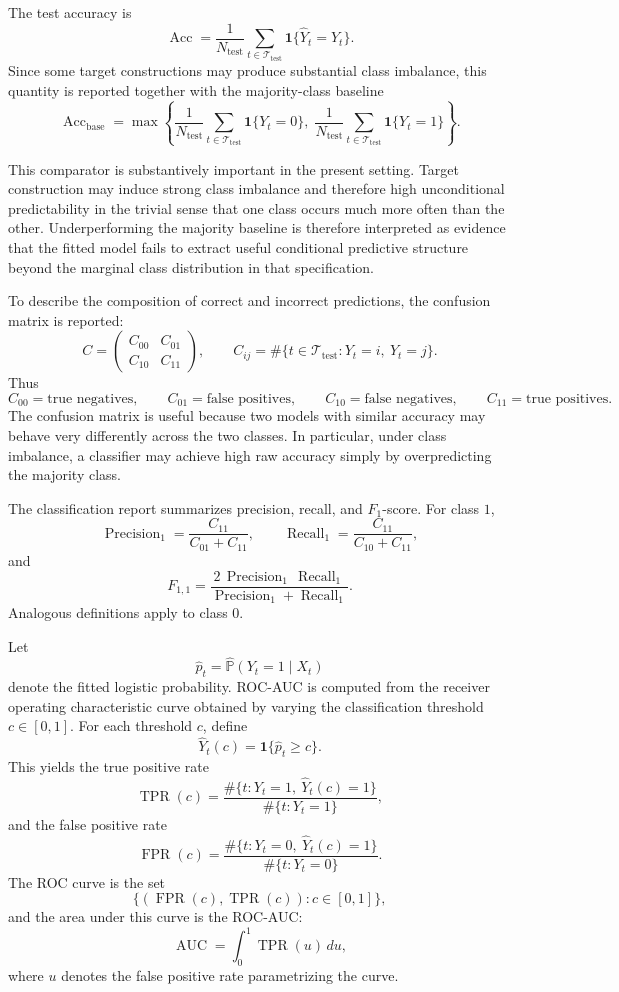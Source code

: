 \documentclass[11pt,a4paper]{article}
\begin{document}
	The test accuracy is
	\[
	\operatorname{Acc}
	=
	\frac{1}{N_{\mathrm{test}}}
	\sum_{t \in \mathcal{T}_{\mathrm{test}}}
	\mathbf{1}\{\widehat Y_t = Y_t\}.
	\]
	Since some target constructions may produce substantial class imbalance, this quantity is reported together with the majority-class baseline
	\[
	\operatorname{Acc}_{\mathrm{base}}
	=
	\max\!\left\{
	\frac{1}{N_{\mathrm{test}}}\sum_{t\in\mathcal{T}_{\mathrm{test}}}\mathbf{1}\{Y_t=0\},
	\;
	\frac{1}{N_{\mathrm{test}}}\sum_{t\in\mathcal{T}_{\mathrm{test}}}\mathbf{1}\{Y_t=1\}
	\right\}.
	\]

	This comparator is substantively important in the present setting. Target construction may induce strong class imbalance and therefore high unconditional predictability in the trivial sense that one class occurs much more often than the other. Underperforming the majority baseline is therefore interpreted as evidence that the fitted model fails to extract useful conditional predictive structure beyond the marginal class distribution in that specification.

	To describe the composition of correct and incorrect predictions, the confusion matrix is reported:
	\[
	C
	=
	\begin{pmatrix}
	C_{00} & C_{01}\\
	C_{10} & C_{11}
	\end{pmatrix},
	\qquad
	C_{ij}
	=
	\#\{t \in \mathcal{T}_{\mathrm{test}} : Y_t=i,\ \widehat Y_t=j\}.
	\]
	Thus
	\[
	C_{00}=\text{true negatives},\qquad
	C_{01}=\text{false positives},\qquad
	C_{10}=\text{false negatives},\qquad
	C_{11}=\text{true positives}.
	\]
	The confusion matrix is useful because two models with similar accuracy may behave very differently across the two classes. In particular, under class imbalance, a classifier may achieve high raw accuracy simply by overpredicting the majority class.

	The classification report summarizes precision, recall, and \(F_1\)-score. For class \(1\),
	\[
	\operatorname{Precision}_1
	=
	\frac{C_{11}}{C_{01}+C_{11}},
	\qquad
	\operatorname{Recall}_1
	=
	\frac{C_{11}}{C_{10}+C_{11}},
	\]
	and
	\[
	F_{1,1}
	=
	\frac{2\,\operatorname{Precision}_1\,\operatorname{Recall}_1}
	{\operatorname{Precision}_1+\operatorname{Recall}_1}.
	\]
	Analogous definitions apply to class \(0\).

	Let
	\[
	\widehat p_t = \widehat{\mathbb{P}}(Y_t=1\mid X_t)
	\]
	denote the fitted logistic probability. ROC-AUC is computed from the receiver operating characteristic curve obtained by varying the classification threshold \(c \in [0,1]\). For each threshold \(c\), define
	\[
	\widehat Y_t(c)=\mathbf{1}\{\widehat p_t \ge c\}.
	\]
	This yields the true positive rate
	\[
	\operatorname{TPR}(c)
	=
	\frac{\#\{t:Y_t=1,\ \widehat Y_t(c)=1\}}
	{\#\{t:Y_t=1\}},
	\]
	and the false positive rate
	\[
	\operatorname{FPR}(c)
	=
	\frac{\#\{t:Y_t=0,\ \widehat Y_t(c)=1\}}
	{\#\{t:Y_t=0\}}.
	\]
	The ROC curve is the set
	\[
	\{(\operatorname{FPR}(c),\operatorname{TPR}(c)) : c\in[0,1]\},
	\]
	and the area under this curve is the ROC-AUC:
	\[
	\operatorname{AUC}
	=
	\int_0^1 \operatorname{TPR}(u)\,du,
	\]
	where \(u\) denotes the false positive rate parametrizing the curve.
\end{document}
